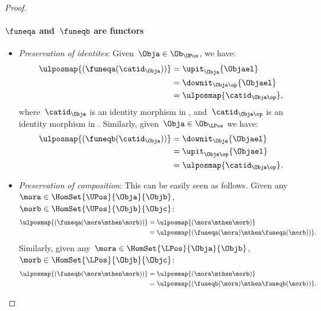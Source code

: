 \begin{proof}
    \paragraph*{$\funeqa$ and~$\funeqb$ are functors}
    \begin{itemize}
        \item \emph{Preservation of identites}: Given~$\Obja\in \Ob_{\UPos}$, we have:
        \begin{equation*}
            \begin{aligned}
                \ulposmap{(\funeqa(\catid_\Obja))}&=\upit_\Obja\{\Objael\}\\
                &=\downit_{\Obja\op}\{\Objael\}\\
                &=\ulposmap{\catid_{\Obja\op}},
            \end{aligned}
        \end{equation*}
        where~$\catid_\Obja$ is an identity morphism in \UPos, and~$\catid_{\Obja\op}$ is an identity morphism in \LPos. Similarly, given~$\Obja\in \Ob_{\LPos}$ we have:
        \begin{equation*}
            \begin{aligned}
                \ulposmap{(\funeqb(\catid_\Obja))}&=\downit_\Obja\{\Objael\}\\
                &=\upit_{\Obja\op}\{\Objael\}\\
                &=\ulposmap{\catid_{\Obja\op}}.
            \end{aligned}
        \end{equation*}
        \item \emph{Preservation of composition}: This can be easily seen as follows. Given any~$\mora\in \HomSet{\UPos}{\Obja}{\Objb}$,~$\morb\in \HomSet{\UPos}{\Objb}{\Objc}$:
        \begin{equation*}
            \begin{aligned}
                \ulposmap{(\funeqa(\mora \mthen \morb))}&=\ulposmap{(\mora\mthen \morb)}\\
                &=\ulposmap{(\funeqa(\mora)\mthen \funeqa(\morb))}.
            \end{aligned}
        \end{equation*}
        Similarly, given any~$\mora\in \HomSet{\LPos}{\Obja}{\Objb}$,~$\morb\in \HomSet{\LPos}{\Objb}{\Objc}$:
        \begin{equation*}
            \begin{aligned}
                \ulposmap{(\funeqb(\mora \mthen \morb))}&=\ulposmap{(\mora \mthen \morb)}\\
                &=\ulposmap{(\funeqb(\mora)\mthen \funeqb(\morb))}.
            \end{aligned}
        \end{equation*}
    \end{itemize}

\end{proof}

